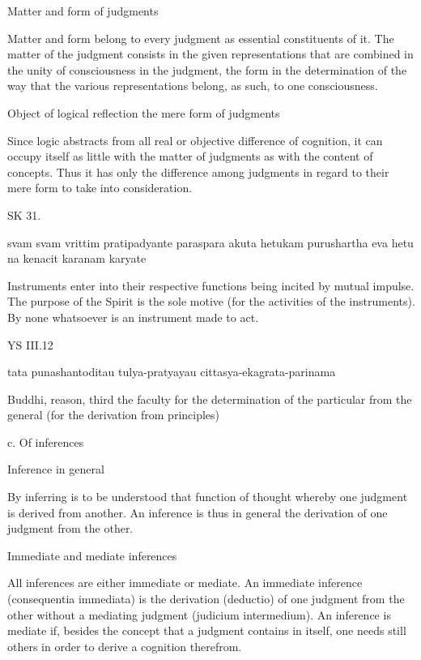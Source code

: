     Matter and form of judgments

        Matter and form belong to every judgment
        as essential constituents of it.
        The matter of the judgment consists in
        the given representations that are combined
        in the unity of consciousness in the judgment,
        the form in the determination of the way that
        the various representations belong, as such,
        to one consciousness.

    Object of logical reflection the mere form of judgments

        Since logic abstracts from all real
        or objective difference of cognition,
        it can occupy itself as little with the matter of judgments
        as with the content of concepts.
        Thus it has only the difference among judgments
        in regard to their mere form to take into consideration.

SK 31.

svam svam vrittim pratipadyante paraspara akuta hetukam
purushartha eva hetu na kenacit karanam karyate

Instruments enter into their respective functions
being incited by mutual impulse.
The purpose of the Spirit is the sole motive
(for the activities of the instruments).
By none whatsoever is an instrument made to act.

YS III.12

    tata punashantoditau tulya-pratyayau cittasya-ekagrata-parinama

    Buddhi, reason, third the faculty for the determination of
    the particular from the general (for the derivation from principles)

    c. Of inferences

    Inference in general

        By inferring is to be understood that function of thought
        whereby one judgment is derived from another.
        An inference is thus in general
        the derivation of one judgment from the other.

    Immediate and mediate inferences

        All inferences are either immediate or mediate.
        An immediate inference (consequentia immediata) is
        the derivation (deductio) of one judgment from the other
        without a mediating judgment (judicium intermedium).
        An inference is mediate if, besides the concept
        that a judgment contains in itself,
        one needs still others in order to
        derive a cognition therefrom.

